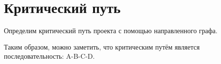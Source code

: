 \section{Критический путь}
Определим критический путь проекта с помощью направленного графа.

Таким образом, можно заметить,
	что критическим путём является последовательность: A-B-C-D.
